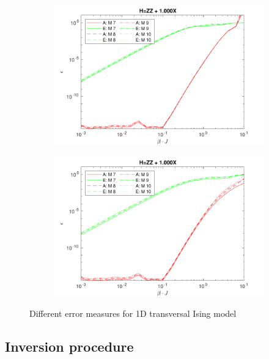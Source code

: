 \begin{figure}[H]
    \begin{subfigure}[]{\linewidth}
        \includegraphics[width=\textwidth]{Figuren/benchmarking/comp_M_cycl.pdf}
    \end{subfigure}
    \begin{subfigure}[]{\linewidth}
        \includegraphics[width=\textwidth]{Figuren/benchmarking/Comp_M_lin.pdf}
    \end{subfigure}
    \caption{ Different error measures for 1D transversal Ising model }
    \label{benchmarking:systemsize}
\end{figure}

\subsection{Inversion procedure}\label{subsec:inversion_procedure}


